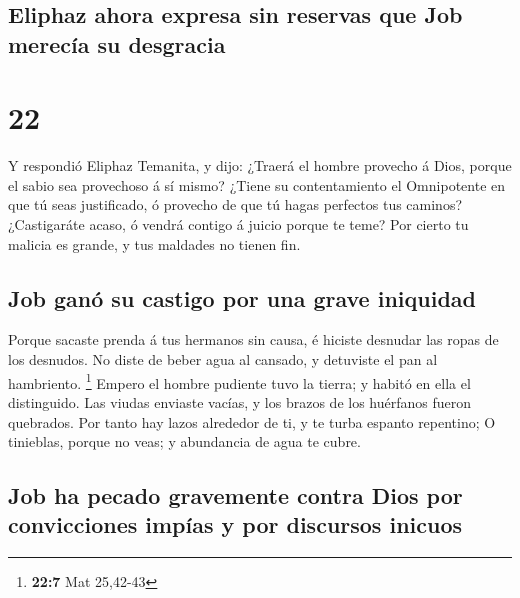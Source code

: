 \hypertarget{eliphaz-ahora-expresa-sin-reservas-que-job-merecuxeda-su-desgracia}{%
\subsection{Eliphaz ahora expresa sin reservas que Job merecía su
desgracia}\label{eliphaz-ahora-expresa-sin-reservas-que-job-merecuxeda-su-desgracia}}

\hypertarget{section-21}{%
\section{22}\label{section-21}}

 Y respondió Eliphaz Temanita, y dijo: 
¿Traerá el hombre provecho á Dios, porque el sabio sea provechoso á sí
mismo?  ¿Tiene su contentamiento el Omnipotente en que tú
seas justificado, ó provecho de que tú hagas perfectos tus caminos?
 ¿Castigaráte acaso, ó vendrá contigo á juicio porque te
teme?  Por cierto tu malicia es grande, y tus maldades no
tienen fin.

\hypertarget{job-ganuxf3-su-castigo-por-una-grave-iniquidad}{%
\subsection{Job ganó su castigo por una grave
iniquidad}\label{job-ganuxf3-su-castigo-por-una-grave-iniquidad}}

 Porque sacaste prenda á tus hermanos sin causa, é hiciste
desnudar las ropas de los desnudos.  No diste de beber
agua al cansado, y detuviste el pan al hambriento. \footnote{\textbf{22:7}
  Mat 25,42-43}  Empero el hombre pudiente tuvo la tierra;
y habitó en ella el distinguido.  Las viudas enviaste
vacías, y los brazos de los huérfanos fueron quebrados. 
Por tanto hay lazos alrededor de ti, y te turba espanto repentino;
 O tinieblas, porque no veas; y abundancia de agua te
cubre.

\hypertarget{job-ha-pecado-gravemente-contra-dios-por-convicciones-impuxedas-y-por-discursos-inicuos}{%
\subsection{Job ha pecado gravemente contra Dios por convicciones impías
y por discursos
inicuos}\label{job-ha-pecado-gravemente-contra-dios-por-convicciones-impuxedas-y-por-discursos-inicuos}}

